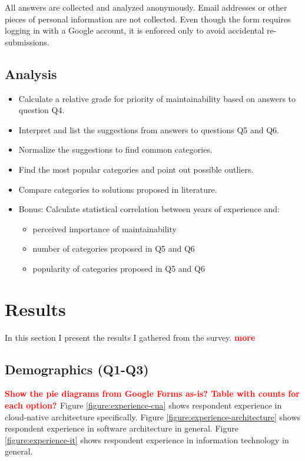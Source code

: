 \documentclass[utf8,english]{gradu3}
\newcommand{\todo}[1]{\textbf{\textcolor{red}{#1}}}
\begin{document}
All answers are collected and analyzed anonymously. Email addresses or other
pieces of personal information are not collected. Even though the form requires
logging in with a Google account, it is enforced only to avoid accidental
re-submissions.


\section{Analysis}

\begin{itemize}
  \item Calculate a relative grade for priority of maintainability based on answers to question Q4.
  \item Interpret and list the suggestions from answers to questions Q5 and Q6.
  \item Normalize the suggestions to find common categories.
  \item Find the most popular categories and point out possible outliers.
  \item Compare categories to solutions proposed in literature.
  \item Bonus: Calculate statistical correlation between years of experience and:
        \begin{itemize}
          \item perceived importance of maintainability
          \item number of categories proposed in Q5 and Q6
          \item popularity of categories proposed in Q5 and Q6
        \end{itemize}
\end{itemize}


\chapter{Results}
\label{chapter:results}

In this section I present the results I gathered from the survey. \todo{more}

\section{Demographics (Q1-Q3)}

\todo{
  Show the pie diagrams from Google Forms as-is? Table with counts for each option?
}
Figure \ref{figure:experience-cna} shows respondent experience in cloud-native architecture specifically.
Figure \ref{figure:experience-architecture} shows respondent experience in software architecture in general.
Figure \ref{figure:experience-it} shows respondent experience in information technology in general.
\end{document}
